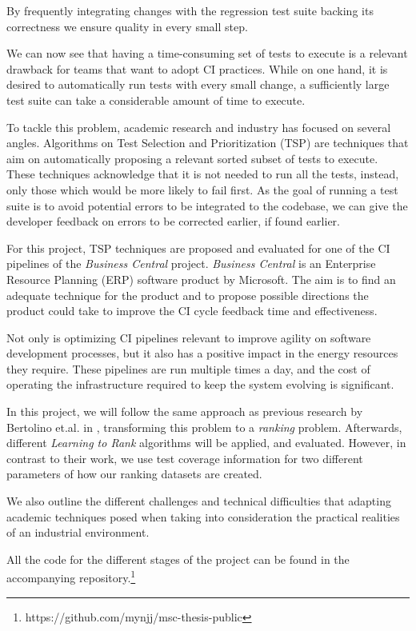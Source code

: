 By frequently integrating changes with the regression test suite backing its correctness
we ensure quality in every small step.

We can now see that having a time-consuming set of tests to execute is a relevant 
drawback for teams that want to adopt CI practices. While on one hand, it is desired
to automatically run tests with every small change, a sufficiently large test suite
can take a considerable amount of time to execute.

To tackle this problem, academic research and industry has focused on several angles.
Algorithms on Test Selection and Prioritization (TSP) are techniques that aim on 
automatically proposing a relevant sorted subset of tests to execute. These techniques
acknowledge that it is not needed to run all the tests, instead, only
those which would be more likely to fail first. As the goal of running a test suite is to
avoid potential errors to be integrated to the codebase, we can give the developer 
feedback on errors to be corrected earlier, if found earlier.

For this project, TSP techniques are proposed and evaluated for one of the CI pipelines
of the \emph{Business Central} project. \emph{Business Central} is an Enterprise Resource Planning (ERP)
software product by Microsoft. The aim is to find an adequate technique
for the product and to propose possible directions the product could take to improve the
CI cycle feedback time and effectiveness.

Not only is optimizing CI pipelines relevant to improve agility on software development
processes, but it also has a positive impact in the energy resources they require.
These pipelines are run multiple times a day, and the cost of operating the infrastructure
required to keep the system evolving is significant.

In this project, we will follow the same approach as previous research by Bertolino
et.al. in \cite{Bertolino2020LearningtoRankVR}, transforming this problem to a \emph{ranking} problem.
Afterwards, different \emph{Learning to Rank} algorithms will be applied, and evaluated.
However, in contrast to their work, we use test coverage information for two different 
parameters of how our ranking datasets are created.

We also outline the different challenges and technical difficulties that adapting
academic techniques posed when taking into consideration the practical realities
of an industrial environment. 

All the code for the different stages of the project can be found 
in the accompanying repository.\footnote{https://github.com/mynjj/msc-thesis-public}